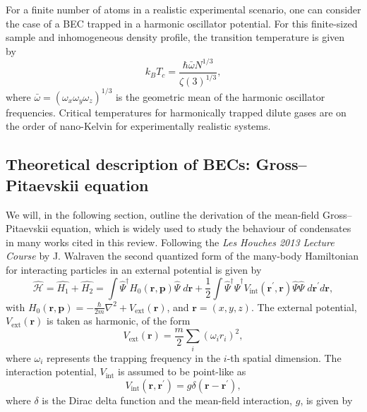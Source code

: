For a finite number of atoms in a realistic experimental scenario, one can consider the case of a BEC trapped in a harmonic oscillator potential. For this finite-sized sample and inhomogeneous density profile, the transition temperature is given by~\cite{BK:Pitaevskii_Stringari_2003}
\begin{equation}
k_BT_c = \frac{\hbar\bar{\omega}N^{1/3}}{\zeta(3)^{1/3}},
\end{equation}
where $\bar{\omega}=(\omega_x\omega_y\omega_z)^{1/3}$ is the geometric mean of the harmonic oscillator frequencies. Critical temperatures for harmonically trapped dilute gases are on the order of nano-Kelvin for experimentally realistic systems.

\subsection{Theoretical description of BECs: Gross--Pitaevskii equation}\label{sub:gpederiv}
We will, in the following section, outline the derivation of the mean-field Gross--Pitaevskii equation, which is widely used to study the behaviour of condensates in many works cited in this review. Following the \textit{Les Houches 2013 Lecture Course} by J. Walraven \cite{LEC:Walraven_lh_2013} the second quantized form of the many-body Hamiltonian for interacting particles in an external potential is given by
\begin{equation}\label{eqn:ham2ndq}
\hat{\mathcal{H}} = \hat{H_1} + \hat{H_2} = \int \hat{\Psi}^{\dagger} H_0\left(\textbf{r},\textbf{p} \right)  \hat{\Psi} \; d\textbf{r}  + \frac{1}{2} \int\hat{\Psi}^{\dagger}\hat{\Psi}^{\dagger}V_{\textrm{int}}(\textbf{r}^\prime,\textbf{r})\hat{\Psi}\hat{\Psi} \; d\textbf{r}^\prime d\textbf{r},
\end{equation}
with $H_0\left(\mathbf{r}, \mathbf{p} \right) = -\frac{\hbar}{2m}\nabla^2 + V_{\textrm{ext}}\left(\mathbf{r}\right)$, and $\mathbf{r} = (x,y,z)$. The external potential, $V_{\text{ext}}(\mathbf{r})$ is taken as harmonic, of the form
\begin{equation}
V_{\text{ext}}(\mathbf{r}) = \frac{m}{2}\displaystyle\sum_{i}{\left(\omega_i r_i \right)^2},\end{equation}
where $\omega_i$ represents the trapping frequency in the $i$-th spatial dimension. The interaction potential, $V_{\text{int}}$ is assumed to be point-like as
\begin{equation}\label{eqn:v_int}
	V_{\text{int}}\left(\mathbf{r},\mathbf{r}^{\prime} \right) = g\delta\left(\mathbf{r} - \mathbf{r}^{\prime}\right),
\end{equation} where $\delta$ is the Dirac delta function and the mean-field interaction, $g$, is given by
